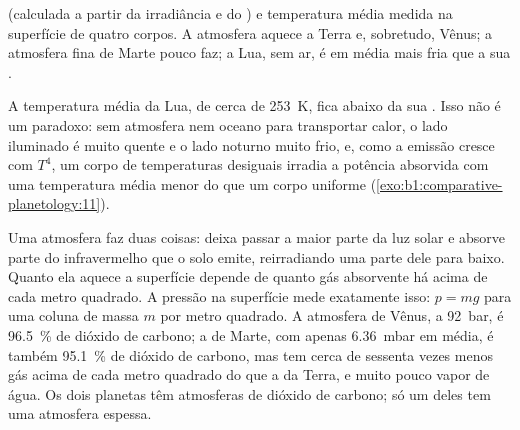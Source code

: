 \begin{omfigure}

{\small {} (calculada a partir da irradiância e do ) e temperatura média medida na superfície de quatro corpos. A atmosfera aquece a Terra e, sobretudo, Vênus; a atmosfera fina de Marte pouco faz; a Lua, sem ar, é em média mais fria que a sua .}
\end{omfigure}

A temperatura média da Lua, de cerca de \qty{253}{K}, fica abaixo da sua . Isso não é um paradoxo: sem atmosfera nem oceano para transportar calor, o lado iluminado é muito quente e o lado noturno muito frio, e, como a emissão cresce com $T^4$, um corpo de temperaturas desiguais irradia a potência absorvida com uma temperatura média menor do que um corpo uniforme (\cref{exo:b1:comparative-planetology:11}).

Uma atmosfera faz duas coisas: deixa passar a maior parte da luz solar e absorve parte do infravermelho que o solo emite, reirradiando uma parte dele para baixo. Quanto ela aquece a superfície depende de quanto gás absorvente há acima de cada metro quadrado. A pressão na superfície mede exatamente isso: $p = mg$ para uma coluna de massa $m$ por metro quadrado. A atmosfera de Vênus, a \qty{92}{bar}, é \qty{96.5}{\percent} de dióxido de carbono; a de Marte, com apenas \qty{6.36}{mbar} em média, é também \qty{95.1}{\percent} de dióxido de carbono, mas tem cerca de sessenta vezes menos gás acima de cada metro quadrado do que a da Terra, e muito pouco vapor de água. Os dois planetas têm atmosferas de dióxido de carbono; só um deles tem uma atmosfera espessa.

